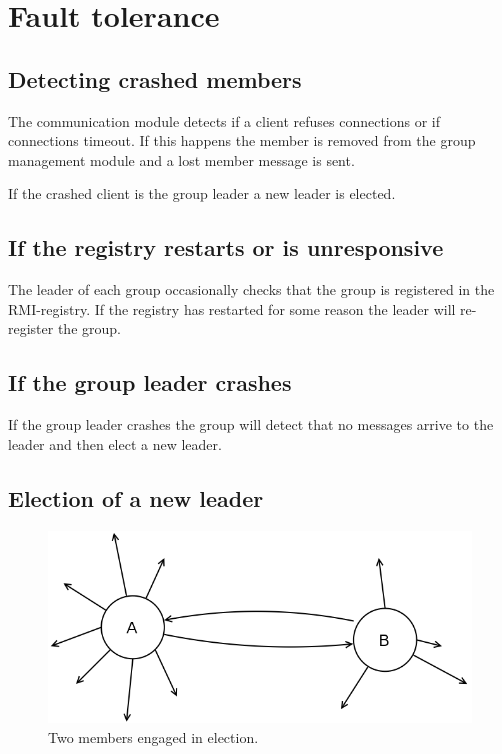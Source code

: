 \documentclass[english]{article}
\begin{document}
\section{Fault tolerance}
\subsection{Detecting crashed members}
The communication module detects if a client refuses connections or if connections timeout. If this happens the member is removed from the group management module and a lost member message is sent.

If the crashed client is the group leader a new leader is elected.

\subsection{If the registry restarts or is unresponsive}
The leader of each group occasionally checks that the group is registered in the RMI-registry. If the registry has restarted for some reason the leader will re-register the group.

\subsection{If the group leader crashes}
If the group leader crashes the group will detect that no messages arrive to the leader and then elect a new leader. 

\subsection{Election of a new leader}

\begin{figure}
\includegraphics[width=\textwidth]{Election.png}
\caption{Two members engaged in election.}
\label{fig:election}
\end{figure}
\end{document}
